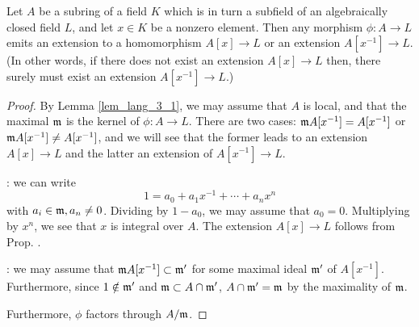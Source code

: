 \begin{prop}\label{thm_lang_3_2}
Let $A$ be a subring of a field $K$ which is in turn a subfield 
of an algebraically closed field $L$, and let $x \in K$ be a 
nonzero element. Then any morphism $\phi: A \to L$ emits an 
extension to a homomorphism $A[x] \to L$ or an extension 
$A[x^{-1}] \to L$. (In other words, if there does not exist an 
extension $A[x] \to L$ then, there surely must exist an extension 
$A[x^{-1}] \to L$.)
\end{prop}
\begin{proof}
By Lemma \ref{lem_lang_3_1}, we may assume that $A$ is local, and
that the maximal $\mathfrak{m}$ is the kernel of $\phi: A \to L$.
There are two cases: $\mathfrak{m}A[x^{-1}] = A[x^{-1}]$ or 
$\mathfrak{m}A[x^{-1}] \neq A[x^{-1}]$, and we will see that the former
leads to an extension $A[x] \to L$ and the latter an extension of
$A[x^{-1}] \to L$.

: we can write
\[
1 = a_0 + a_1x^{-1} + \cdots + a_nx^{n}
\]
with $a_i \in \mathfrak{m}, a_n \neq 0$. Dividing by $1 - a_0$, we 
may assume that $a_0 = 0$. Multiplying by $x^n$, we see that $x$ 
is integral over $A$. The extension $A[x] \to L$ follows from 
Prop. \label{prop_lang_3_1}.

: we may assume 
that $\mathfrak{m}A[x^{-1}] \subset \mathfrak{m'}$ for some maximal 
ideal $\mathfrak{m'}$ of $A[x^{-1}]$. Furthermore, since $1 \notin 
\mathfrak{m'}$ and $\mathfrak{m} \subset A \cap \mathfrak{m'}$, $A \cap 
\mathfrak{m'} = \mathfrak{m}$ by the maximality of $\mathfrak{m}$.

Furthermore, $\phi$ factors through $A/\mathfrak{m}$.
\end{proof}
